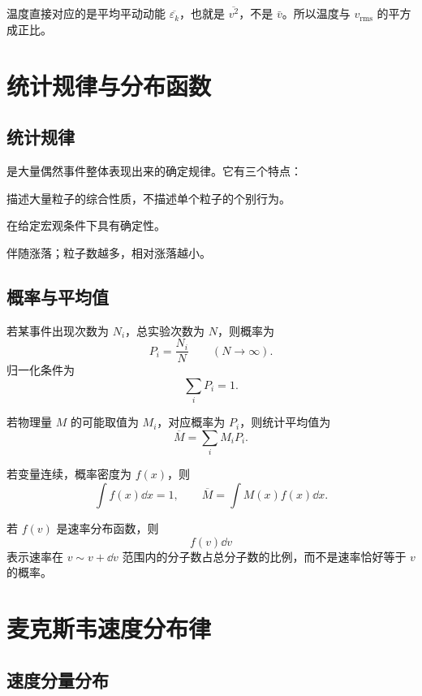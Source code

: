 \begin{WarnBox}
温度直接对应的是平均平动动能 \(\overline{\varepsilon_k}\)，也就是 \(\overline{v^2}\)，不是 \(\bar v\)。所以温度与 \(v_{\mathrm{rms}}\) 的平方成正比。
\end{WarnBox}

\section{统计规律与分布函数}

\subsection{统计规律}

是大量偶然事件整体表现出来的确定规律。它有三个特点：
\begin{ReviewList}
  \item 描述大量粒子的综合性质，不描述单个粒子的个别行为。
  \item 在给定宏观条件下具有确定性。
  \item 伴随涨落；粒子数越多，相对涨落越小。
\end{ReviewList}

\subsection{概率与平均值}

若某事件出现次数为 \(N_i\)，总实验次数为 \(N\)，则概率为
\[
  P_i=\frac{N_i}{N}
  \qquad
  (N\to\infty).
\]
归一化条件为
\[
  \sum_i P_i=1.
\]

若物理量 \(M\) 的可能取值为 \(M_i\)，对应概率为 \(P_i\)，则统计平均值为
\[
  \boxed{
  \overline{M}=\sum_i M_iP_i
  }.
\]

若变量连续，概率密度为 \(f(x)\)，则
\[
  \int f(x)\dd x=1,
  \qquad
  \overline{M}=\int M(x)f(x)\dd x.
\]

\begin{KeyBox}[分布函数的读法]
若 \(f(v)\) 是速率分布函数，则
\[
  f(v)\dd v
\]
表示速率在 \(v\sim v+\dd v\) 范围内的分子数占总分子数的比例，而不是速率恰好等于 \(v\) 的概率。
\end{KeyBox}

\section{麦克斯韦速度分布律}

\subsection{速度分量分布}

